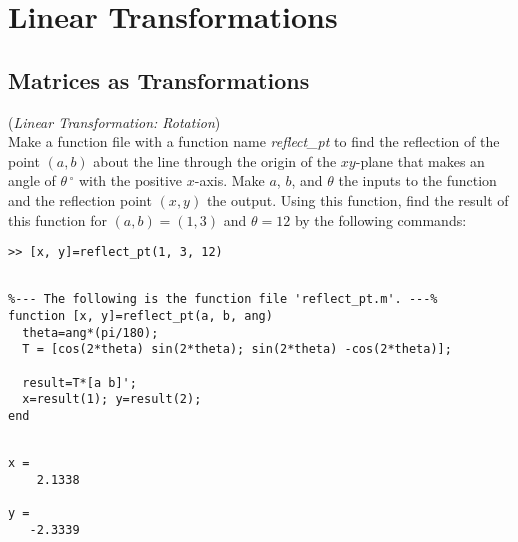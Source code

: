 \chapter{Linear Transformations}

\section{Matrices as Transformations}

\begin{exer} (\textit{Linear Transformation: Rotation})\\
Make a function file with a function name \textit{reflect\_pt} to find the reflection of the point $(a,b)$ about the line through the origin of the $xy$-plane that makes an angle of $\theta\,^{\circ}$ with the positive $x$-axis. Make $a$, $b$, and $\theta$ the inputs to the function and the reflection point $(x,y)$ the output. Using this function, find the result of this function for $(a,b)=(1,3)$ and $\theta=12$ by the following commands:

\vspace{2mm}

\begin{verbatim}
>> [x, y]=reflect_pt(1, 3, 12)
\end{verbatim}

\end{exer}



\begin{sol}
\begin{verbatim}

%--- The following is the function file 'reflect_pt.m'. ---%
function [x, y]=reflect_pt(a, b, ang)
  theta=ang*(pi/180);
  T = [cos(2*theta) sin(2*theta); sin(2*theta) -cos(2*theta)];
    
  result=T*[a b]';
  x=result(1); y=result(2);
end
\end{verbatim}

\begin{outputs}

\begin{verbatim}

x =
    2.1338
    
y =
   -2.3339
\end{verbatim}
\end{outputs}
\end{sol}

\vspace{3mm}

